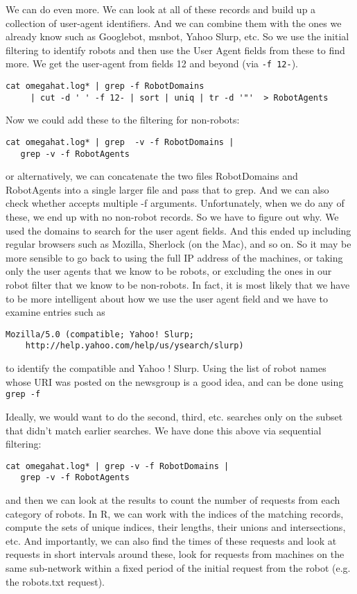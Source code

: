 \begin{enumerate}
We can do even more. We can look at all of these records and build up a collection of user-agent
identifiers.  And we can combine them with the ones we already know such as Googlebot, msnbot, Yahoo
Slurp, etc.  So we use the initial filtering to identify robots and then use the User Agent fields
from these to find more.
We get the user-agent from fields 12 and beyond (via \verb+-f 12-+).
\begin{verbatim}
cat omegahat.log* | grep -f RobotDomains  
     | cut -d ' ' -f 12- | sort | uniq | tr -d '"'  > RobotAgents
\end{verbatim}
Now we could add these to the filtering for non-robots:
\begin{verbatim}
cat omegahat.log* | grep  -v -f RobotDomains | 
   grep -v -f RobotAgents
\end{verbatim}
or alternatively, we can concatenate the two files
RobotDomains and RobotAgents into a single larger file
and pass that to grep.
And we can also check whether 
accepts multiple -f arguments.
Unfortunately, when we do any of these, we end up with no
non-robot records. So we have to figure out why.
We used the domains to search  for the user agent fields.
And this ended up including regular browsers such as  Mozilla, Sherlock (on the Mac), 
and so on. So it may be more sensible to go back to using the 
full IP address of the machines, or
taking only the user agents that we know to be robots, or excluding
the ones in our robot filter  that we know to be non-robots.
In fact, it is most likely that we have to be more intelligent
about how we use the user agent field and we have to
examine entries such as 
\begin{verbatim}
Mozilla/5.0 (compatible; Yahoo! Slurp; 
    http://help.yahoo.com/help/us/ysearch/slurp)
\end{verbatim}
to identify the compatible and Yahoo ! Slurp.
Using the list of robot names 
whose URI  was posted on the 
newsgroup is a good idea, and can be done
using \verb+grep -f+




Ideally, we would want to do the second, third, etc. searches only on the subset 
that didn't match earlier searches. We have done this above
via sequential filtering:
\begin{verbatim}
cat omegahat.log* | grep -v -f RobotDomains | 
   grep -v -f RobotAgents
\end{verbatim}
and then we can look at the results to count the number of requests from each category of robots.
In R, we can work with the indices of the matching records, compute the sets of
unique indices, their lengths, their unions and intersections, etc.  And importantly, we can also
find the times of these requests and look at requests in short intervals around these, look for
requests from machines on the same sub-network within a fixed period of the initial request from the
robot (e.g. the robots.txt request).



\end{enumerate}
